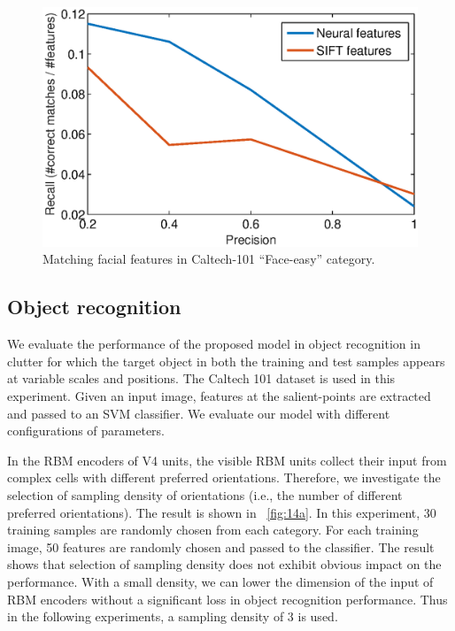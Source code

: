 \documentclass[twocolumn]{article}
\begin{document}
\begin{figure}[!t]
\centerline{\includegraphics[width=0.9\linewidth]{images/fig13.eps}} 
\caption{Matching facial features in Caltech-101 ``Face-easy'' category.}
\label{fig:13}
\end{figure}

\subsection{Object recognition}

We evaluate the performance of the proposed model in object recognition in clutter for which 
the target object in both the training and test samples appears at variable scales and positions.
The Caltech 101 dataset \cite{fei2007} is used in this experiment.
Given an input image, features at the salient-points are extracted and passed to an SVM classifier.
We evaluate our model with different configurations of parameters.

In the RBM encoders of V4 units, the visible RBM units collect their input from complex cells with different preferred orientations.
Therefore, we investigate the selection of sampling density of orientations (i.e., the number of different preferred orientations).
The result is shown in \figurename~\ref{fig:14a}.
In this experiment, 30 training samples are randomly chosen from each category.
For each training image, 50 features are randomly chosen and passed to the classifier.
The result shows that selection of sampling density does not exhibit obvious impact on the performance.
With a small density, we can lower the dimension of the input of RBM encoders without a significant loss in object recognition performance.
Thus in the following experiments, a sampling density of $3$ is used. 
\end{document}
